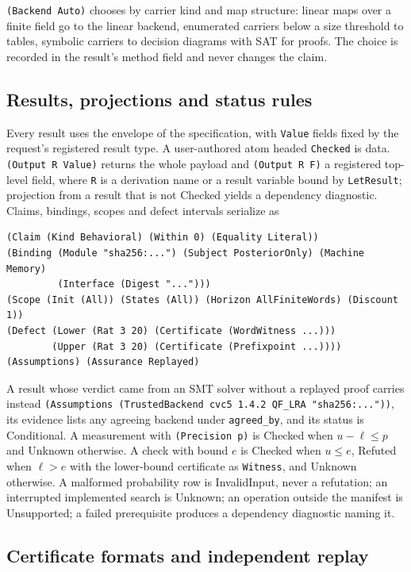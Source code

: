 \documentclass[11pt]{article}
\newcommand{\code}[1]{\texttt{#1}}
\begin{document}
\code{(Backend Auto)} chooses by carrier kind and map structure: linear maps over a finite field go to
the linear backend, enumerated carriers below a size threshold to tables, symbolic carriers to decision
diagrams with SAT for proofs. The choice is recorded in the result's method field and never changes the
claim.

\subsection{Results, projections and status rules}

Every result uses the envelope of the specification, with \code{Value} fields fixed by the request's
registered result type. A user-authored atom headed \code{Checked} is data. \code{(Output R Value)}
returns the whole payload and \code{(Output R F)} a registered top-level field, where \code{R} is a
derivation name or a result variable bound by \code{LetResult}; projection from a result that is not
Checked yields a dependency diagnostic. Claims, bindings, scopes and defect intervals serialize as
\begin{lstlisting}
(Claim (Kind Behavioral) (Within 0) (Equality Literal))
(Binding (Module "sha256:...") (Subject PosteriorOnly) (Machine Memory)
         (Interface (Digest "...")))
(Scope (Init (All)) (States (All)) (Horizon AllFiniteWords) (Discount 1))
(Defect (Lower (Rat 3 20) (Certificate (WordWitness ...)))
        (Upper (Rat 3 20) (Certificate (Prefixpoint ...))))
(Assumptions) (Assurance Replayed)
\end{lstlisting}
A result whose verdict came from an SMT solver without a replayed proof carries instead
\code{(Assumptions (TrustedBackend cvc5 1.4.2 QF\_LRA "sha256:..."))}, its evidence lists any
agreeing backend under \code{agreed\_by}, and its status is Conditional.
A measurement with \code{(Precision p)} is Checked when $u-\ell\le p$ and Unknown otherwise. A check
with bound $e$ is Checked when $u\le e$, Refuted when $\ell>e$ with the lower-bound certificate as
\code{Witness}, and Unknown otherwise. A malformed probability row is InvalidInput, never a refutation;
an interrupted implemented search is Unknown; an operation outside the manifest is Unsupported; a
failed prerequisite produces a dependency diagnostic naming it.

\subsection{Certificate formats and independent replay}\label{sec:replay}
\end{document}
